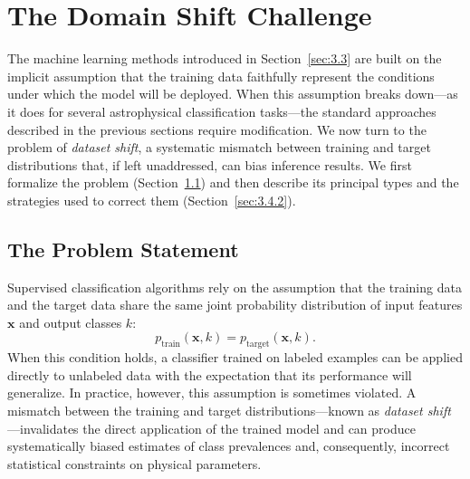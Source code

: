 \section{The Domain Shift Challenge}
\label{sec:3.4}

The machine learning methods introduced in Section~\ref{sec:3.3} are built on the implicit assumption that the training data faithfully represent the conditions under which the model will be deployed.
When this assumption breaks down---as it does for several astrophysical classification tasks---the standard approaches described in the previous sections require modification.
We now turn to the problem of \textit{dataset shift}, a systematic mismatch between training and target distributions that, if left unaddressed, can bias inference results.
We first formalize the problem (Section~\ref{sec:3.4.1}) and then describe its principal types and the strategies used to correct them (Section~\ref{sec:3.4.2}).

\subsection{The Problem Statement}
\label{sec:3.4.1}

Supervised classification algorithms rely on the assumption that the training data and the target data share the same joint probability distribution of input features $\mathbf{x}$ and output classes $k$:
\begin{equation}
	p_{\text{train}}(\mathbf{x}, k) = p_{\text{target}}(\mathbf{x}, k).
	\label{eq:dataset_shift_assumption}
\end{equation}
When this condition holds, a classifier trained on labeled examples can be applied directly to unlabeled data with the expectation that its performance will generalize.
In practice, however, this assumption is sometimes violated.
A mismatch between the training and target distributions---known as \textit{dataset shift} \cite{MorenoTorres2012AUV}---invalidates the direct application of the trained model and can produce systematically biased estimates of class prevalences and, consequently, incorrect statistical constraints on physical parameters.


